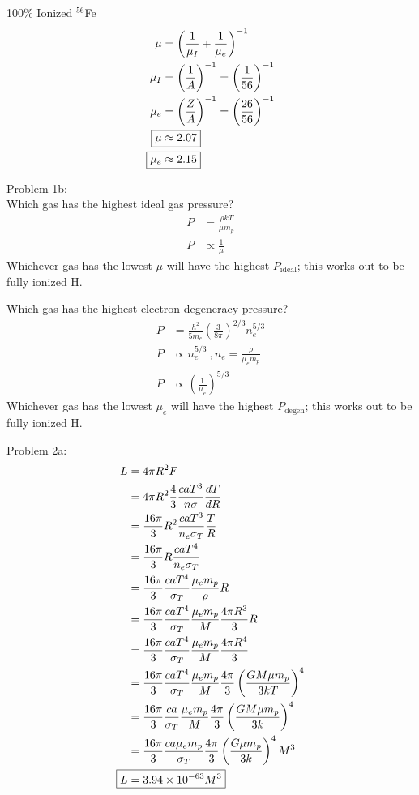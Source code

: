 \documentclass[10pt,letter,preprint]{aastex}
\newcommand{\pt}{\propto}
\newcommand{\rp}{\right)}
\newcommand{\lp}{\left(}
\begin{document}
100\% Ionized $^{56}$Fe
\begin{align}
\mu &= \lp \frac{1}{\mu_I} + \frac{1}{\mu_e} \rp^{-1}\\
\mu_I &= \lp \frac{1}{A} \rp^{-1} =  \lp \frac{1}{56} \rp^{-1}\\
\mu_e &= \lp \frac{Z}{A}\rp^{-1}=   \lp \frac{26}{56} \rp^{-1}\\
\Aboxed{\mu &\approx 2.07}\\
\Aboxed{\mu_e &\approx 2.15}
\end{align}

Problem 1b:\\
Which gas has the highest ideal gas pressure?
\begin{align}
P &= \frac{\rho kT}{\mu m_p}\\
P &\pt \frac{1}{\mu}
\end{align}
Whichever gas has the lowest $\mu$ will have the highest $P_{\textrm{ideal}}$; this works out to be fully ionized H.

Which gas has the highest electron degeneracy pressure?
\begin{align}
P &= \frac{h^2}{5m_e} \lp \frac{3}{8\pi} \rp^{2/3} n_e^{5/3}\\
P &\pt n_e^{5/3}~,n_e = \frac{\rho}{\mu_e m_p}\\
P &\pt \lp \frac{1}{\mu_e} \rp^{5/3}
\end{align}
Whichever gas has the lowest $\mu_e$ will have the highest $P_{\textrm{degen}}$; this works out to be fully ionized H.

\newpage
Problem 2a:\\
\begin{align}
L &= 4\pi R^2 F\\
&= 4 \pi R^2 \frac{4}{3} \frac{caT^3}{n\sigma}\frac{dT}{dR}\\
&= \frac{16 \pi}{3} R^2 \frac{caT^3}{n_e \sigma_T}\frac{T}{R}\\
&=\frac{16 \pi}{3} R \frac{caT^4}{n_e \sigma_T}\\
&= \frac{16 \pi}{3} \frac{caT^4}{\sigma_T} \frac{\mu_e m_p}{\rho}R\\
&= \frac{16 \pi}{3} \frac{caT^4}{\sigma_T} \frac{\mu_e m_p}{M}\frac{4\pi R^3}{3}R\\
&= \frac{16 \pi}{3} \frac{caT^4}{\sigma_T} \frac{\mu_e m_p}{M}\frac{4\pi R^4}{3}\\
&= \frac{16 \pi}{3} \frac{caT^4}{\sigma_T} \frac{\mu_e m_p}{M}\frac{4\pi}{3} \lp \frac{GM\mu m_p}{3kT} \rp^4 \\
&= \frac{16 \pi}{3} \frac{ca}{\sigma_T} \frac{\mu_e m_p}{M}\frac{4\pi}{3} \lp \frac{GM\mu m_p}{3k} \rp^4 \\
&= \frac{16 \pi}{3} \frac{ca\mu_e m_p}{\sigma_T}\frac{4\pi}{3} \lp \frac{G\mu m_p}{3k} \rp^4 M^3\\
\Aboxed{L &= 3.94 \times 10^{-63}M^3}
\end{align}
\end{document}
